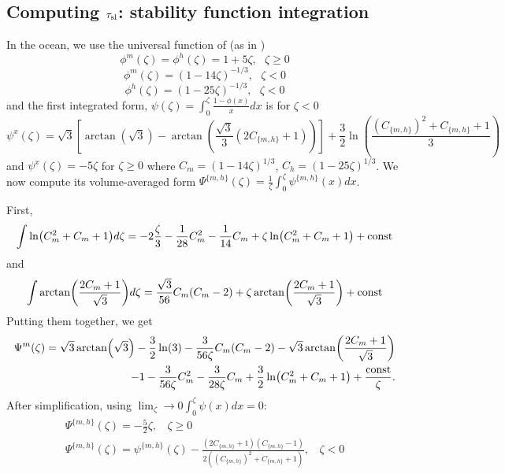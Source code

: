 \subsection{Computing $\tau_{\rm sl}$: stability function integration}
\label{sec:ND_Ocean_stabilityFunctionIntegration}
In the ocean, we use the universal function of \citep{large2019similarity} (as in \citep{pelletier2021two})
\begin{equation}
	\phi^m(\zeta) = \phi^h(\zeta) = 1+5\zeta, ~~~ \zeta \geq 0
\end{equation}
\begin{equation}
	\phi^m(\zeta) = (1-14\zeta)^{-1/3}, ~~~ \zeta < 0
\end{equation}
\begin{equation}
	\phi^h(\zeta) = (1-25\zeta)^{-1/3}, ~~~ \zeta < 0
\end{equation}
and the first integrated form, $\psi(\zeta)= \int_0^\zeta \frac{1-\phi(x)}{x}dx$ is for $\zeta<0$
\begin{equation}
	\psi^x(\zeta)  = \sqrt{3}\left[\arctan(\sqrt{3}) -
	\arctan\left(\frac{\sqrt{3}}{3}(2C_{\{m,h\}}+1)\right)\right]
	+ \frac{3}{2}\ln \left(\frac{(C_{\{m,h\}})^2 + C_{\{m,h\}} + 1}{3}\right)
\end{equation}
and $\psi^x(\zeta) = -5\zeta$ for $\zeta \geq 0$
where $C_m = (1-14\zeta)^{1/3}$, $C_h = (1-25\zeta)^{1/3}$.
We now compute its volume-averaged form $\Psi^{\{m,h\}}(\zeta)= \frac{1}{\zeta}\int_0^\zeta \psi^{\{m,h\}}(x)dx$.
\par
First,
\begin{equation}
	\int \ln (C_m^2+C_m+1)d\zeta
	= -2 \frac{\zeta}{3} - \frac{1}{28}C_m^2 - \frac{1}{14}C_m
	+\zeta\ln (C_m^2+C_m+1) + {\rm const}
\end{equation}
and
\begin{equation}
	\int \arctan (\frac{2C_m+1}{\sqrt{3}})d\zeta
	= \frac{\sqrt{3}}{56}C_m(C_m-2)
	+ \zeta \arctan (\frac{2C_m+1}{\sqrt{3}}) + {\rm const}
\end{equation}
Putting them together, we get
\begin{equation}
\begin{aligned}
	\Psi^m(\zeta)=\sqrt{3}\arctan(\sqrt{3})- 
	\frac{3}{2}\ln(3) -
	\frac{3}{56\zeta}C_m(C_m-2)
	- \sqrt{3} \arctan (\frac{2C_m+1}{\sqrt{3}})
	\\
	-1 - \frac{3}{56\zeta}C_m^2 - \frac{3}{28\zeta}C_m
	+\frac{3}{2}\ln (C_m^2+C_m+1)
	+ \frac{{\rm const}}{\zeta}.
\end{aligned}
\end{equation}
After simplification, using $\lim_\zeta\to0 \int_0^\zeta\psi(x)dx = 0$:
\begin{equation}
\begin{aligned}
\Psi^{\{m,h\}}(\zeta)= -\frac{5}{2}\zeta, ~~~~ \zeta \geq 0 \\
	\Psi^{\{m,h\}}(\zeta)=
	\psi^{\{m,h\}}(\zeta)
	- \frac{(2C_{\{m,h\}}+1)(C_{\{m,h\}} - 1)}
	{2\left((C_{\{m,h\}})^2 + C_{\{m,h\}} + 1\right)}, ~~~~ \zeta < 0
\end{aligned}
\end{equation}
